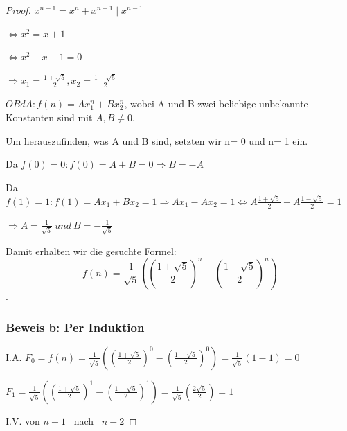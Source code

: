 \documentclass[12pt]{article}
\begin{document}
\begin{algorithm}
\begin{proof}
\vspace{0.2cm}
$x^{n+1} = x^n + x^{n-1}    \mid x^{n-1}$

$\Leftrightarrow x^2 = x+1 $

 $\Leftrightarrow x^2 -x- 1 = 0$ 
\vspace{0.15cm}


$ \Rightarrow x_1 = \frac{1 + \sqrt{5}}{2} ,  x_2= \frac{1 - \sqrt{5}}{2}$

\vspace{0.3cm}

\noindent $OBdA: f(n)= Ax_1^n + Bx_2^n$, wobei A und B zwei beliebige unbekannte Konstanten sind mit $A,B \neq 0.$

\vspace{0.2cm}
\noindent Um herauszufinden, was A und B sind, setzten wir n= 0 und n= 1 ein. 

\vspace{0.2cm}

Da  $f(0)= 0:  f(0)= A+B= 0  \Rightarrow B= -A$

Da $ f(1)= 1: f(1)= Ax_1+ Bx_2= 1 \Rightarrow Ax_1 - Ax_2= 1


\Leftrightarrow  A \frac{1 + \sqrt{5}}{2} -A \frac{1 - \sqrt{5}}{2}= 1 $

\vspace{0.15cm}
 
$\Rightarrow A= \frac{1}{\sqrt{5}} \ und \ B= - \frac{1}{\sqrt{5}}$

\vspace{0.3cm}

\noindent Damit erhalten wir die gesuchte Formel: $$f(n)= \frac{1}{\sqrt{5}} ((\frac{1 + \sqrt{5}}{2})^n - ( \frac{1 - \sqrt{5}}{2})^n)$$.


\vspace{1cm}
\subsubsection*{Beweis b: Per Induktion}

I.A. $ F_0= f(n)= 
  \frac{1}{\sqrt{5}}((\frac{1 + \sqrt{5}}{2})^0 - ( \frac{1 - \sqrt{5}}{2})^0) = \frac{1}{\sqrt{5}} (1-1)= 0 $

\vspace{0.15cm}
    $F_1=  \frac{1}{\sqrt{5}} ((\frac{1 + \sqrt{5}}{2})^1 - ( \frac{1 - \sqrt{5}}{2})^1)= \frac{1}{\sqrt{5}} (\frac{2\sqrt{5}}{2}) = 1 $

\vspace{0.4cm}

\noindent I.V. von $n-1$ \ nach \ $ n-2$


\end{proof}
\end{algorithm}
\end{document}
